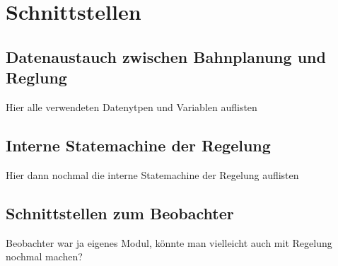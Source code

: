 \chapter{Schnittstellen}
\section{Datenaustauch zwischen Bahnplanung und Reglung}
Hier alle verwendeten Datenytpen und Variablen auflisten
\section{Interne Statemachine der Regelung}
Hier dann nochmal die interne Statemachine der Regelung auflisten
\section{Schnittstellen zum Beobachter}
Beobachter war ja eigenes Modul, könnte man vielleicht auch mit Regelung nochmal machen?